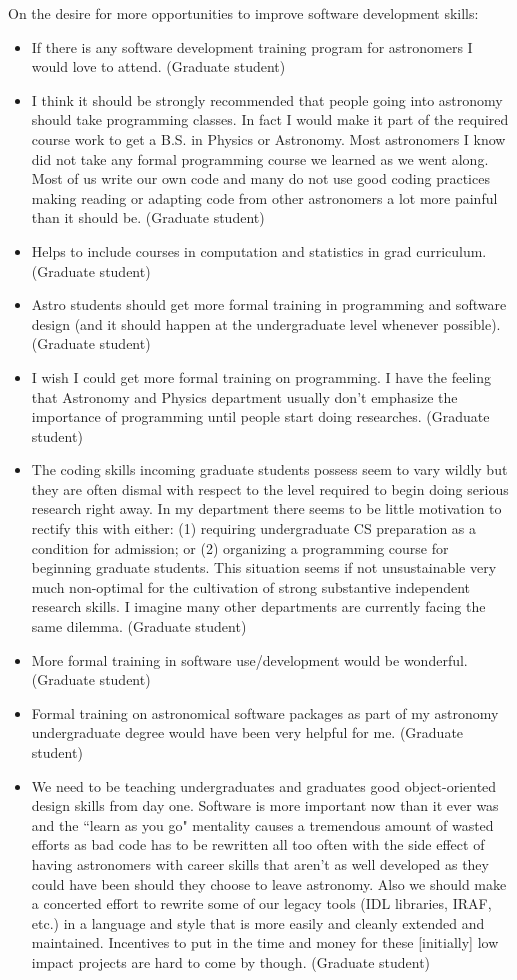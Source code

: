 \begin{appendix}
On the desire for more opportunities to improve software development skills:

\begin{itemize}
\item{If there is any software development training program for astronomers I would love to attend. (Graduate student)}
\item{I think it should be strongly recommended that people going into astronomy should take programming classes. In fact I would make it part of the required course work to get a B.S. in Physics or Astronomy. Most astronomers I know did not take any formal programming course we learned as we went along. Most of us write our own code and many do not use good coding practices making reading or adapting code from other astronomers a lot more painful than it should be. (Graduate student)}
\item{Helps to include courses in computation and statistics in grad curriculum. (Graduate student)}
\item{Astro students should get more formal training in programming and software design (and it should happen at the undergraduate level whenever possible). (Graduate student)}
\item{I wish I could get more formal training on programming. I have the feeling that Astronomy and Physics department usually don't emphasize the importance of programming until people start doing researches. (Graduate student)}
\item{The coding skills incoming graduate students possess seem to vary wildly but they are often dismal with respect to the level required to begin doing serious research right away. In my department there seems to be little motivation to rectify this with either: (1) requiring undergraduate CS preparation as a condition for admission; or (2) organizing a programming course for beginning graduate students. This situation seems if not unsustainable very much non-optimal for the cultivation of strong substantive independent research skills. I imagine many other departments are currently facing the same dilemma. (Graduate student)}
\item{More formal training in software use/development would be wonderful. (Graduate student)}
\item{Formal training on astronomical software packages as part of my astronomy undergraduate degree would have been very helpful for me. (Graduate student)}
\item{We need to be teaching undergraduates and graduates good object-oriented design skills from day one. Software is more important now than it ever was and the ``learn as you go" mentality causes a tremendous amount of wasted efforts as bad code has to be rewritten all too often with the side effect of having astronomers with career skills that aren't as well developed as they could have been should they choose to leave astronomy. Also we should make a concerted effort to rewrite some of our legacy tools (IDL libraries, IRAF, etc.) in a language and style that is more easily and cleanly extended and maintained. Incentives to put in the time and money for these [initially] low impact projects are hard to come by though. (Graduate student)}


\end{itemize}
\end{appendix}
